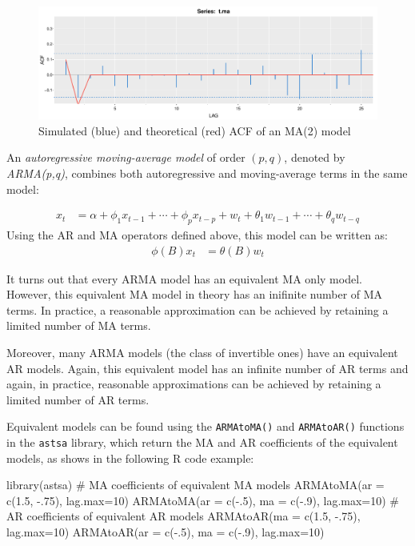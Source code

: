 \begin{figure}
\centering
\includegraphics[width=.75\textwidth]{figure19.pdf}
\caption{Simulated (blue) and theoretical (red) ACF of an MA(2) model}
\label{fig:figure19}
\end{figure}

An \emph{autoregressive moving-average model} of order $(p, q)$, denoted by \emph{ARMA(p,q)}, combines both autoregressive and moving-average terms in the same model:

\begin{align*}
x_t &= \alpha + \phi_1 x_{t-1} + \cdots + \phi_p x_{t-p} + w_t + \theta_1 w_{t-1} + \cdots + \theta_q w_{t-q} 
\end{align*}
\noindent Using the AR and MA operators defined above, this model can be written as:
\begin{align*}
\phi(B) x_t &= \theta (B) w_t 
\end{align*}

It turns out that every ARMA model has an equivalent MA only model. However, this equivalent MA model in theory has an inifinite number of MA terms. In practice, a reasonable approximation can be achieved by retaining a limited number of MA terms.

Moreover, many ARMA models (the class of invertible ones) have an equivalent AR models. Again, this equivalent model has an infinite number of AR terms and again, in practice, reasonable approximations can be achieved by retaining a limited number of AR terms.

Equivalent models can be found using the \texttt{ARMAtoMA()} and \texttt{ARMAtoAR()} functions in the \texttt{astsa} library, which return the MA and AR coefficients of the equivalent models, as shows in the following R code example:

\begin{samepage}
\begin{Rcode}
library(astsa)
# MA coefficients of equivalent MA models
ARMAtoMA(ar = c(1.5, -.75), lag.max=10)
ARMAtoMA(ar = c(-.5), ma = c(-.9), lag.max=10)
# AR coefficients of equivalent AR models
ARMAtoAR(ma = c(1.5, -.75), lag.max=10)
ARMAtoAR(ar = c(-.5), ma = c(-.9), lag.max=10)
\end{Rcode}
\end{samepage}

